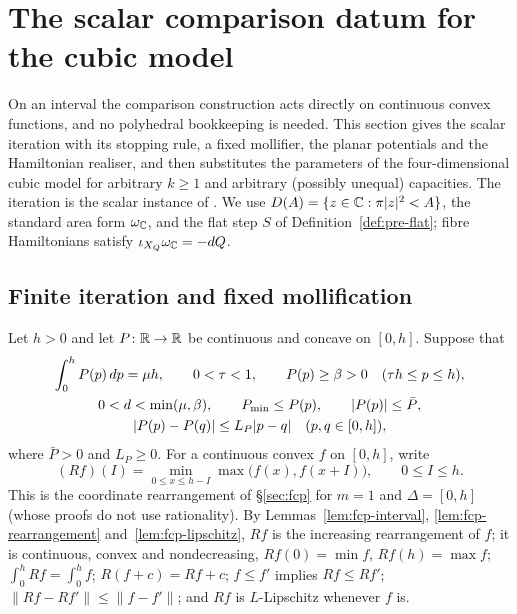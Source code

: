 \section{The scalar comparison datum for the cubic model}\label{sec:scalar-cmp}

On an interval the comparison construction acts directly on continuous convex functions, and no polyhedral
bookkeeping is needed. This section gives the scalar iteration with its stopping rule, a fixed mollifier, the planar
potentials and the Hamiltonian realiser, and then substitutes the parameters of the four-dimensional cubic model for
arbitrary $k\ge1$ and arbitrary (possibly unequal) capacities. The iteration is the scalar instance of
\cite[\S2]{OpenAI2026}. We use $D(A)=\{z\in\mathbb{C}:\pi|z|^2<A\}$, the standard area form $\omega_{\mathbb{C}}$, and the flat step $S$ of
Definition~\ref{def:pre-flat}; fibre Hamiltonians satisfy $\iota_{X_Q}\omega_{\mathbb{C}}=-dQ$.

\subsection{Finite iteration and fixed mollification}\label{sec:scalar-iteration}

Let $h>0$ and let $P\colon\mathbb{R}\to\mathbb{R}$ be continuous and concave on $[0,h]$. Suppose that
\begin{gather}\label{eq:scalar-input}
 \int_0^hP(p)\,dp=\mu h,\qquad 0<\tau<1,\qquad
 P(p)\ge\beta>0\quad(\tau h\le p\le h),\\
 0<d<\min(\mu,\beta),\qquad P_{\min}\le P(p),\qquad |P(p)|\le\bar P,\notag\\
 |P(p)-P(q)|\le L_P|p-q|\quad(p,q\in[0,h]),\notag
\end{gather}
where $\bar P>0$ and $L_P\ge0$. For a continuous convex $f$ on $[0,h]$, write
\begin{equation}\label{eq:scalar-rearrangement}
 (Rf)(I)=\min_{0\le x\le h-I}\max\bigl(f(x),f(x+I)\bigr),\qquad 0\le I\le h.
\end{equation}
This is the coordinate rearrangement of \S\ref{sec:fcp} for $m=1$ and $\Delta=[0,h]$ (whose proofs do not use
rationality). By Lemmas~\ref{lem:fcp-interval}, \ref{lem:fcp-rearrangement} and~\ref{lem:fcp-lipschitz}, $Rf$ is the
increasing rearrangement of $f$; it is continuous, convex and nondecreasing, $Rf(0)=\min f$, $Rf(h)=\max f$;
$\int_0^hRf=\int_0^hf$; $R(f+c)=Rf+c$; $f\le f'$ implies $Rf\le Rf'$; $\|Rf-Rf'\|\le\|f-f'\|$; and $Rf$ is
$L$-Lipschitz whenever $f$ is.

